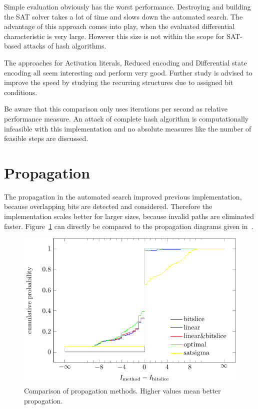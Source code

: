 Simple evaluation obviously has the worst performance. Destroying and building the SAT solver takes a lot of time and slows down the automated search. The advantage of this approach comes into play, when the evaluated differential characteristic is very large. However this size is not within the scope for SAT-based attacks of hash algorithms.

The approaches for Activation literals, Reduced encoding and Differential state encoding all seem interesting and perform very good. Further study is advised to improve the speed by studying the recurring structures due to assigned bit conditions.

Be aware that this comparison only uses iterations per second as relative performance measure. An attack of complete hash algorithm is computationally infeasible with this implementation and no absolute measures like the number of feasible steps are discussed.

\section{Propagation}
%
The propagation in the automated search improved previous implementation, because overlapping bits are detected and considered. Therefore the implementation scales better for larger sizes, because invalid paths are eliminated faster. Figure~\ref{fig:sat-propagation} can directly be compared to the propagation diagrams given in~\cite{Cry16}.
%
\begin{figure}[t]
 \begin{center}
  \includegraphics{img/propagation.pdf}
  \caption[Comparison of propagation methods.]{Comparison of propagation methods. Higher values mean better propagation.}
  \label{fig:sat-propagation}
 \end{center}
\end{figure}

